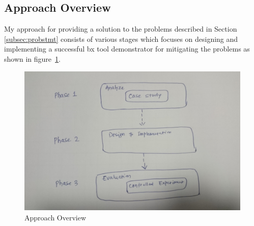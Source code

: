 \subsection{Approach Overview}\label{subsec:approach}
My approach for providing a solution to the problems described in Section \ref{subsec:probstmt}  consists of various stages which focuses on designing and implementing a successful bx tool demonstrator for mitigating the problems as shown in figure~\ref{fig:Approach_Overview}. 

\begin{figure}
	\includegraphics[width=1\textwidth]{figures/Approach_Overview}
	\caption{Approach Overview}
	\label{fig:Approach_Overview}
\end{figure}

